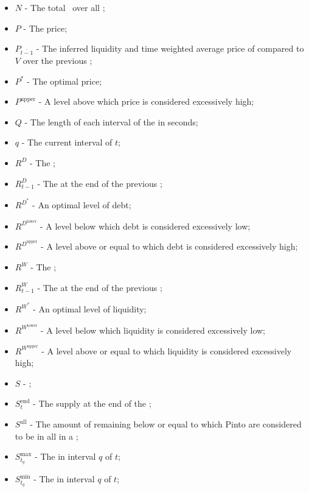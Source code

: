 \documentclass[class=article, crop=false]{standalone}
\begin{document}
\begin{itemize}[topsep=0pt, itemsep=3pt,leftmargin=16pt]
    \item[] $N$ - The total  \Pinto\ over all ;
    \item[] $P$ - The price;
    \item[] $P_{\overline{t-1}}$ - The inferred liquidity and time weighted average price of  compared to $V$ over the previous ;
    \item[] $P^{*}$ - The optimal price;
    \item[] $P^{\text{upper}}$ - A level above which price is considered excessively high;
    \item[] $Q$ - The length of each interval of the  in seconds; 
    \item[] $q$ - The current interval of $t$;
    \item[] $R^{D}$ - The ;
    \item[] $R_{t-1}^{D}$ - The  at the end of the previous ;
    \item[] $R^{D^{*}}$ - An optimal level of debt;
    \item[] $R^{D^{\text{lower}}}$ - A level below which debt is considered excessively low;
    \item[] $R^{D^{\text{upper}}}$ - A level above or equal to which debt is considered excessively high;
    \item[] $R^{W}$ - The ;
    \item[] $R_{t-1}^{W}$ - The  at the end of the previous ;
    \item[] $R^{W^{*}}$ - An optimal level of liquidity;
    \item[] $R^{W^{\text{lower}}}$ - A level below which liquidity is considered excessively low;
    \item[] $R^{W^{\text{upper}}}$ - A level above or equal to which liquidity is considered excessively high;
    \item[] $S$ - ;
    \item[] $S_{t}^{\text{end}}$ - The  supply at the end of the ;
    \item[] $S^{\text{all}}$ - The amount of remaining  below or equal to which Pinto are considered to be  in all  in a ;
    \item[] $S_{t_{q}}^{\text{max}}$ - The  in interval $q$ of $t$;
    \item[] $S_{t_{q}}^{\text{min}}$ - The  in interval $q$ of $t$;

\end{itemize}
\end{document}

